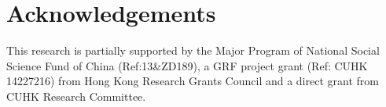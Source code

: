 \documentclass[a4paper]{article}
\begin{document}
\section{Acknowledgements}

This research is partially supported by the Major Program of National Social Science Fund of  China (Ref:13\&ZD189),
a GRF project grant (Ref: CUHK 14227216) from Hong Kong Research Grants Council  and a direct grant from CUHK Research Committee.





\end{document}
